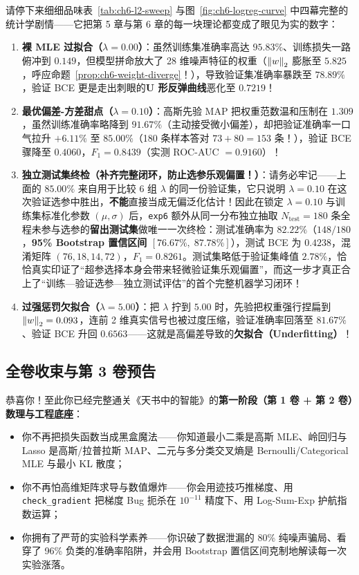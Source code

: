 请停下来细细品味表~\ref{tab:ch6-l2-sweep} 与图~\ref{fig:ch6-logreg-curve} 中四幕完整的统计学剧情——它把第 5 章与第 6 章的每一块理论都变成了眼见为实的数字：
\begin{enumerate}
  \item \textbf{裸 MLE 过拟合（$\lambda = 0.00$）}：虽然训练集准确率高达 $95.83\%$、训练损失一路俯冲到 $0.149$，但模型拼命放大了 28 维噪声特征的权重（$\left\|w\right\|_2$ 膨胀至 $5.825$，呼应命题~\ref{prop:ch6-weight-diverge}！），导致验证集准确率暴跌至 $78.89\%$，验证 BCE 更是走出刺眼的\textbf{U 形反弹曲线}恶化至 $0.7219$！
  \item \textbf{最优偏差-方差甜点（$\lambda = 0.10$）}：高斯先验 MAP 把权重范数温和压制在 $1.309$，虽然训练准确率略降到 $91.67\%$（主动接受微小偏差），却把验证准确率一口气拉升 $+6.11\%$ 至 $\mathbf{85.00\%}$（180 条样本答对 $73 + 80 = 153$ 条！），验证 BCE 骤降至 $\mathbf{0.4060}$，$F_1 = \mathbf{0.8439}$（实测 ROC-AUC $= \mathbf{0.9160}$）！
  \item \textbf{独立测试集终检（补齐完整闭环，防止选参乐观偏置！）}：请务必牢记——上面的 $85.00\%$ 来自用于比较 $6$ 组 $\lambda$ 的同一份验证集，它只说明 $\lambda=0.10$ 在这次验证选参中胜出，\textbf{不能}直接当成无偏泛化估计！因此在锁定 $\lambda = 0.10$ 与训练集标准化参数 $(\mu, \sigma)$ 后，\texttt{exp6} 额外从同一分布独立抽取 $N_{\mathrm{test}} = 180$ 条全程未参与选参的\textbf{留出测试集}做唯一一次终检：测试准确率为 $\mathbf{82.22\%}$（$148/180$，\textbf{95\% Bootstrap 置信区间 $[76.67\%,\; 87.78\%]$}），测试 BCE 为 $\mathbf{0.4238}$，混淆矩阵 $(76, 18, 14, 72)$，$F_1 = \mathbf{0.8261}$。测试集略低于验证集峰值 $2.78\%$，恰恰真实印证了“超参选择本身会带来轻微验证集乐观偏置”，而这一步才真正合上了“训练—验证选参—独立测试评估”的首个完整机器学习闭环！
  \item \textbf{过强惩罚欠拟合（$\lambda = 5.00$）}：把 $\lambda$ 拧到 $5.00$ 时，先验把权重强行捏扁到 $\left\|w\right\|_2 = 0.093$，连前 2 维真实信号也被过度压缩，验证准确率回落至 $81.67\%$、验证 BCE 升回 $0.6563$——这就是高偏差导致的\textbf{欠拟合（Underfitting）}！
\end{enumerate}

\subsection{全卷收束与第 3 卷预告}
\label{subsec:ch6-wrapup}

恭喜你！至此你已经完整通关《天书中的智能》的\textbf{第一阶段（第 1 卷 + 第 2 卷）数理与工程底座}：
\begin{itemize}
  \item 你不再把损失函数当成黑盒魔法——你知道最小二乘是高斯 MLE、岭回归与 Lasso 是高斯/拉普拉斯 MAP、二元与多分类交叉熵是 Bernoulli/Categorical MLE 与最小 KL 散度；
  \item 你不再怕高维矩阵求导与数值爆炸——你会用迹技巧推梯度、用 \texttt{check\_gradient} 把梯度 Bug 扼杀在 $10^{-11}$ 精度下、用 Log-Sum-Exp 护航指数运算；
  \item 你拥有了严苛的实验科学素养——你识破了数据泄漏的 80\% 纯噪声骗局、看穿了 96\% 负类的准确率陷阱，并会用 Bootstrap 置信区间克制地解读每一次实验涨落。
\end{itemize}

